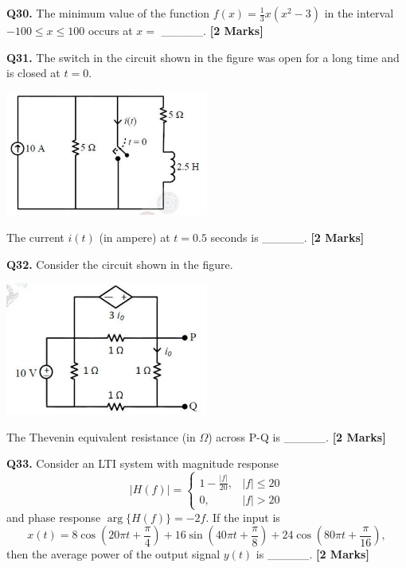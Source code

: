 \documentclass[11pt]{article}
\newcommand{\questionb}[2]{
    \noindent\textbf{Q#2.} #1 \hfill \textbf{[2 Marks]}
}
\begin{document}
\vspace{0.5cm}

\questionb{The minimum value of the function $f(x) = \frac{1}{3}x(x^2 - 3)$ in the interval $-100 \leq x \leq 100$ occurs at $x = $ \_\_\_\_\_.}{30}

\vspace{0.5cm}

\questionb{The switch in the circuit shown in the figure was open for a long time and is closed at $t = 0$.
\begin{center}
\includegraphics[width=0.5\textwidth]{figures/31.png}
\end{center}
The current $i(t)$ (in ampere) at $t = 0.5$ seconds is \_\_\_\_\_.}{31}

\vspace{0.5cm}

\questionb{Consider the circuit shown in the figure.
\begin{center}
\includegraphics[width=0.5\textwidth]{figures/32.png}
\end{center}
The Thevenin equivalent resistance (in $\Omega$) across P-Q is \_\_\_\_\_.}{32}

\vspace{0.5cm}

\questionb{Consider an LTI system with magnitude response
\[
|H(f)| = 
\begin{cases} 
1 - \frac{|f|}{20}, & |f| \leq 20 \\ 
0, & |f| > 20 
\end{cases}
\]
and phase response $\arg \{ H(f) \} = -2f$. If the input is
\[
x(t) = 8 \cos\left(20\pi t + \frac{\pi}{4}\right) + 16 \sin\left(40\pi t + \frac{\pi}{8}\right) + 24 \cos\left(80\pi t + \frac{\pi}{16}\right),
\]
then the average power of the output signal $y(t)$ is \_\_\_\_\_.}{33}
\end{document}
